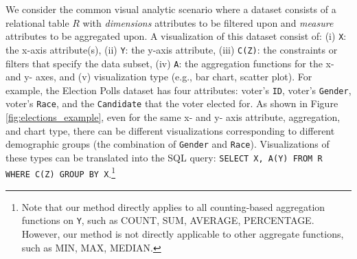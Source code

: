 \npar {} We consider the common visual analytic scenario where a dataset consists of a relational table $R$ with \textit{dimensions} attributes to be filtered upon and \textit{measure} attributes to be aggregated upon. A visualization of this dataset consist of: (i) {\tt X}: the x-axis attribute(s), (ii) {\tt Y}: the y-axis attribute, (iii) {\tt C(Z)}: the constraints or filters that specify the data subset, (iv) {\tt A}: the aggregation functions for the x- and y- axes, and (v) visualization type (e.g., bar chart, scatter plot). For example, the Election Polls dataset has four attributes: voter's {\tt ID}, voter's {\tt Gender}, voter's {\tt Race}, and the {\tt Candidate} that the voter elected for. As shown in Figure \ref{fig:elections_example}, even for the same x- and y- axis attribute, aggregation, and chart type, there can be different visualizations corresponding to different demographic groups (the combination of {\tt Gender} and {\tt Race}). Visualizations of these types can be translated into the \textsc{SQL} query: {\tt SELECT X, A(Y) FROM R WHERE C(Z) GROUP BY X}.\footnote{Note that our method directly applies to all counting-based aggregation functions on {\tt Y}, such as \textsc{COUNT}, \textsc{SUM}, \textsc{AVERAGE}, \textsc{PERCENTAGE}. However, our method is not directly applicable to other aggregate functions, such as \textsc{MIN}, \textsc{MAX}, \textsc{MEDIAN}.} 
